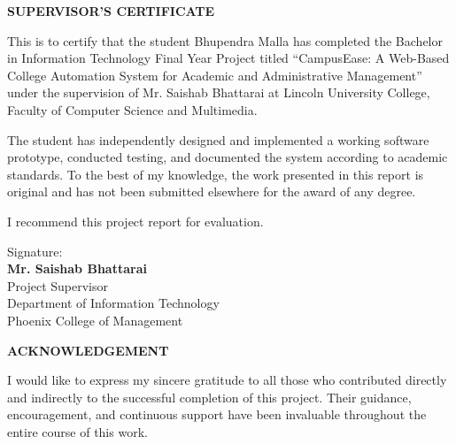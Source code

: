 \documentclass[12pt,a4paper]{report}
\begin{document}
\clearpage

\begin{center}\textbf{\fontsize{16}{19}\selectfont SUPERVISOR'S CERTIFICATE}\end{center}
\vspace{0.6cm}

This is to certify that the student Bhupendra Malla has completed the Bachelor in Information Technology Final Year Project titled ``CampusEase: A Web-Based College Automation System for Academic and Administrative Management'' under the supervision of Mr. Saishab Bhattarai at Lincoln University College, Faculty of Computer Science and Multimedia.

The student has independently designed and implemented a working software prototype, conducted testing, and documented the system according to academic standards. To the best of my knowledge, the work presented in this report is original and has not been submitted elsewhere for the award of any degree.

I recommend this project report for evaluation.

\vspace{2.5cm}

\noindent
Signature: \underline{\hspace{5.5cm}}\\[0.4cm]
\textbf{Mr. Saishab Bhattarai}\\
Project Supervisor\\
Department of Information Technology\\
Phoenix College of Management

\clearpage

\begin{center}\textbf{\fontsize{16}{19}\selectfont ACKNOWLEDGEMENT}\end{center}
\vspace{0.6cm}

I would like to express my sincere gratitude to all those who contributed directly and indirectly to the successful completion of this project. Their guidance, encouragement, and continuous support have been invaluable throughout the entire course of this work.
\end{document}
